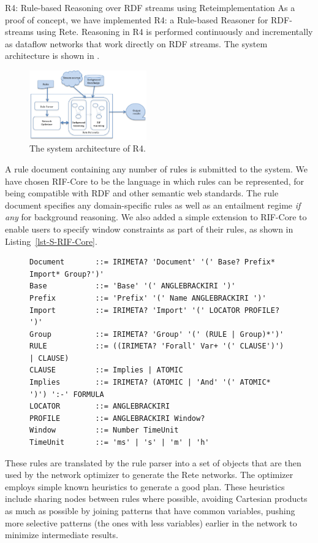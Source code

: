 \begin{nestedsection}{R4: Rule-based Reasoning over RDF streams using Rete}{implementation}
	As a proof of concept, we have implemented R4: a Rule-based Reasoner for RDF-streams using Rete.
	Reasoning in R4 is performed continuously and incrementally as dataflow networks that work directly on RDF streams.
	The system architecture is shown in .
	\begin{figure}[t]
		\centering
		\includegraphics[width=0.45\textwidth]{R4-architecture}
		\caption{The system architecture of R4.}
	\end{figure}

	A rule document containing any number of rules is submitted to the system.
	We have chosen RIF-Core to be the language in which rules can be represented, for being compatible with RDF and other semantic web standards.
	The rule document specifies any domain-specific rules as well as an entailment regime \emph{if any} for background reasoning.
	We also added a simple extension to RIF-Core to enable users to specify window constraints as part of their rules, as shown in Listing~\ref{lst-S-RIF-Core}.
	\begin{figure}
		\centering
		\begin{lstlisting}[caption=Streaming RIF-Core Grammar,label=lst-S-RIF-Core]
Document       ::= IRIMETA? 'Document' '(' Base? Prefix* Import* Group?')'
Base           ::= 'Base' '(' ANGLEBRACKIRI ')'
Prefix         ::= 'Prefix' '(' Name ANGLEBRACKIRI ')'
Import         ::= IRIMETA? 'Import' '(' LOCATOR PROFILE? ')'
Group          ::= IRIMETA? 'Group' '(' (RULE | Group)*')' 
RULE           ::= ((IRIMETA? 'Forall' Var+ '(' CLAUSE')') | CLAUSE)
CLAUSE         ::= Implies | ATOMIC
Implies        ::= IRIMETA? (ATOMIC | 'And' '(' ATOMIC* ')') ':-' FORMULA
LOCATOR        ::= ANGLEBRACKIRI
PROFILE        ::= ANGLEBRACKIRI Window?
Window         ::= Number TimeUnit
TimeUnit       ::= 'ms' | 's' | 'm' | 'h'
		\end{lstlisting}
	\end{figure}

	These rules are translated by the rule parser into a set of objects that are then used by the network optimizer to generate the Rete networks.
	The optimizer employs simple known heuristics to generate a good plan.
	These heuristics include sharing nodes between rules where possible, avoiding Cartesian products as much as possible by joining patterns that have common variables, pushing more selective patterns (the ones with less variables) earlier in the network to minimize intermediate results.
	

\end{nestedsection}
